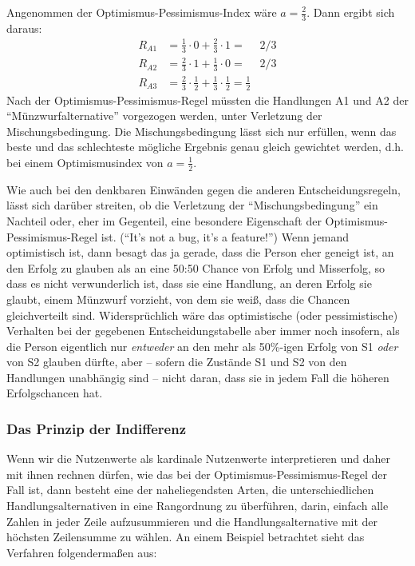 Angenommen der Optimismus-Pessimismus-Index wäre $a = \frac{2}{3}$. Dann ergibt
sich daraus:
\begin{eqnarray*}
R_{A1} & = \frac{1}{3} \cdot 0 + \frac{2}{3} \cdot 1 = & 2/3 \\
R_{A2} & = \frac{2}{3} \cdot 1 + \frac{1}{3} \cdot 0 = & 2/3 \\
R_{A3} & = \frac{2}{3} \cdot \frac{1}{2} + \frac{1}{3} \cdot \frac{1}{2} =
\frac{1}{2}
\end{eqnarray*}
Nach der Optimismus-Pessimismus-Regel müssten die Handlungen A1 und A2 der
"`Münzwurfalternative"' vorgezogen werden, unter Verletzung der
Mischungsbedingung. Die Mischungsbedingung lässt sich nur erfüllen, wenn das
beste und das schlechteste mögliche Ergebnis genau gleich gewichtet
werden, d.h. bei einem Optimismusindex von $a=\frac{1}{2}$. 

Wie auch bei den denkbaren Einwänden gegen die anderen Entscheidungsregeln, lässt
sich darüber streiten, ob die Verletzung der "`Mischungsbedingung"' ein Nachteil
oder, eher im Gegenteil, eine besondere Eigenschaft der
Optimismus-Pessimismus-Regel ist. ("`It's not a bug, it's a feature!"') Wenn
jemand optimistisch ist, dann besagt das ja gerade, dass die Person eher geneigt
ist, an den Erfolg zu glauben als an eine 50:50 Chance von Erfolg und Misserfolg,
so dass es nicht verwunderlich ist, dass sie eine Handlung, an deren Erfolg sie
glaubt, einem Münzwurf vorzieht, von dem sie weiß, dass die Chancen
gleichverteilt sind. Widersprüchlich wäre das optimistische (oder pessimistische)
Verhalten bei der gegebenen Entscheidungstabelle aber immer noch insofern, als
die Person eigentlich nur {\em entweder} an den mehr als 50\%-igen Erfolg von S1
{\em oder} von S2 glauben dürfte, aber -- sofern die Zustände S1 und S2 von den
Handlungen unabhängig sind -- nicht daran, dass sie in jedem Fall die höheren
Erfolgschancen hat.

\subsubsection{Das Prinzip der Indifferenz}
\label{Indifferenzprinzip}
Wenn wir die Nutzenwerte als kardinale Nutzenwerte interpretieren und daher mit
ihnen rechnen dürfen, wie das bei der Optimismus-Pessimismus-Regel der Fall
ist, dann besteht eine der naheliegendsten Arten, die unterschiedlichen
Handlungsalternativen in eine Rangordnung zu überführen, darin, einfach alle
Zahlen in jeder Zeile aufzusummieren und die Handlungsalternative mit der
höchsten Zeilensumme zu wählen. An einem Beispiel betrachtet sieht das
Verfahren folgendermaßen aus:

